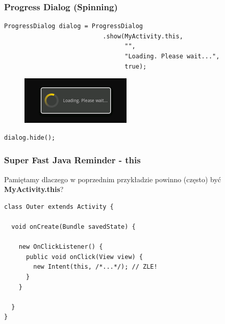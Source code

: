 \documentclass{beamer}
\begin{document}
% 

\begin{frame}[fragile]\frametitle{Progress Dialog (Spinning)}
\begin{lstlisting}
ProgressDialog dialog = ProgressDialog
                           .show(MyActivity.this, 
                                 "", 
                                 "Loading. Please wait...", 
                                 true);
\end{lstlisting}

\begin{figure}
 \centering
 \includegraphics[width=.5\textwidth]{images/dialog_progress_spinning}
\end{figure}

\pause

\begin{lstlisting}
dialog.hide();
\end{lstlisting}
\end{frame}

\begin{frame}[fragile]\frametitle{Super Fast Java Reminder - \textbf{this}}
Pamiętamy dlaczego w poprzednim przykładzie powinno (często) być \textbf{MyActivity.this}?
\begin{lstlisting}
class Outer extends Activity { 

  void onCreate(Bundle savedState) {

    new OnClickListener() {
      public void onClick(View view) {
        new Intent(this, /*...*/); // ZLE!
      }
    }

  }
}
\end{lstlisting}
\end{frame}
\end{document}
